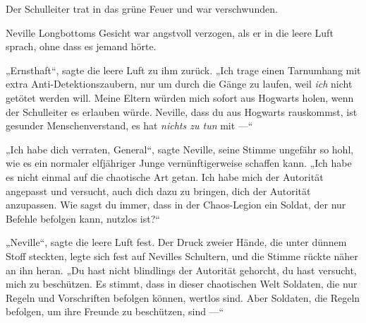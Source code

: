 Der Schulleiter trat in das grüne Feuer und war verschwunden.


Neville Longbottoms Gesicht war angstvoll verzogen, als er in die leere Luft sprach, ohne dass es jemand hörte.

„Ernsthaft“, sagte die leere Luft zu ihm zurück.
„Ich trage einen Tarnumhang mit extra Anti-Detektionszaubern, nur um durch die Gänge zu laufen, weil \emph{ich} nicht getötet werden will. Meine Eltern würden mich sofort aus Hogwarts holen, wenn der Schulleiter es erlauben würde. Neville, dass du aus Hogwarts rauskommst, ist gesunder Menschenverstand, es hat \emph{nichts zu tun} mit —“

„Ich habe dich verraten, General“, sagte Neville, seine Stimme ungefähr so hohl, wie es ein normaler elfjähriger Junge vernünftigerweise schaffen kann.
„Ich habe es nicht einmal auf die chaotische Art getan. Ich habe mich der Autorität angepasst und versucht, auch dich dazu zu bringen, dich der Autorität anzupassen. Wie sagst du immer, dass in der Chaos-Legion ein Soldat, der nur Befehle befolgen kann, nutzlos ist?“

„Neville“, sagte die leere Luft fest. Der Druck zweier Hände, die unter dünnem Stoff steckten, legte sich fest auf Nevilles Schultern, und die Stimme rückte näher an ihn heran.
„Du hast nicht blindlings der Autorität gehorcht, du hast versucht, mich zu beschützen. Es stimmt, dass in dieser chaotischen Welt Soldaten, die nur Regeln und Vorschriften befolgen können, wertlos sind. Aber Soldaten, die Regeln befolgen, um ihre Freunde zu beschützen, sind —“

